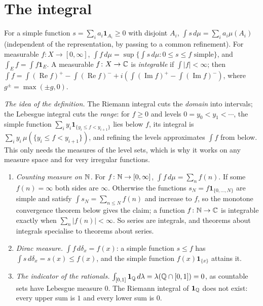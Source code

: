 \section{The integral}\label{measure-theory:section-integral}

\begin{definition}\label{measure-theory:definition-integral}
For a simple function $s = \sum_ia_i\mathbf{1}_{A_i} \geq 0$ with disjoint $A_i$, $\int s\,d\mu = \sum_ia_i\mu(A_i)$ (independent of the representation, by passing to a common refinement). For measurable
$f \colon X \to [0, \infty]$, $\int f\,d\mu = \sup\{\int s\,d\mu : 0 \leq s \leq f \text{ simple}\}$, and $\int_Ef = \int f\mathbf{1}_E$. A measurable $f \colon X \to \mathbb{C}$ is \emph{integrable} if $\int|f| < \infty$; then
$\int f = \int(\operatorname{Re}f)^+ - \int(\operatorname{Re}f)^- + i(\int(\operatorname{Im}f)^+ - \int(\operatorname{Im}f)^-)$, where $g^\pm = \max(\pm g, 0)$.
\end{definition}

\emph{The idea of the definition.} The Riemann integral cuts the \emph{domain} into intervals; the Lebesgue integral cuts the \emph{range}: for $f \geq 0$ and levels $0 = y_0 < y_1 < \cdots$, the simple
function $\sum_iy_i\mathbf{1}_{\{y_i \leq f < y_{i+1}\}}$ lies below $f$, its integral is $\sum_iy_i\,\mu(\{y_i \leq f < y_{i+1}\})$, and refining the levels approximates $\int f$ from below. This only needs the
measures of the level sets, which is why it works on any measure space and for very irregular functions.

\begin{example}\label{measure-theory:example-integrals}
\begin{enumerate}
\item \emph{Counting measure on $\mathbb{N}$.} For $f \colon \mathbb{N} \to [0, \infty]$, $\int f\,d\mu = \sum_nf(n)$. If some $f(n) = \infty$ both sides are $\infty$. Otherwise the functions $s_N = f\mathbf{1}_{\{0, \ldots, N\}}$ are simple and satisfy $\int s_N = \sum_{n \leq N}f(n)$ and increase to $f$, so the monotone convergence theorem below gives the claim; a function $f \colon \mathbb{N} \to \mathbb{C}$ is integrable
exactly when $\sum_n|f(n)| < \infty$. So series are integrals, and theorems about integrals specialise to theorems about series.
\item \emph{Dirac measure.} $\int f\,d\delta_x = f(x)$: a simple function $s \leq f$ has $\int s\,d\delta_x = s(x) \leq f(x)$, and the simple function $f(x)\mathbf{1}_{\{x\}}$ attains it.
\item \emph{The indicator of the rationals.} $\int_{[0, 1]}\mathbf{1}_{\mathbb{Q}}\,d\lambda = \lambda(\mathbb{Q} \cap [0, 1]) = 0$, as countable sets have Lebesgue measure $0$. The Riemann integral of $\mathbf{1}_{\mathbb{Q}}$ does
not exist: every upper sum is $1$ and every lower sum is $0$.
\end{enumerate}
\end{example}

